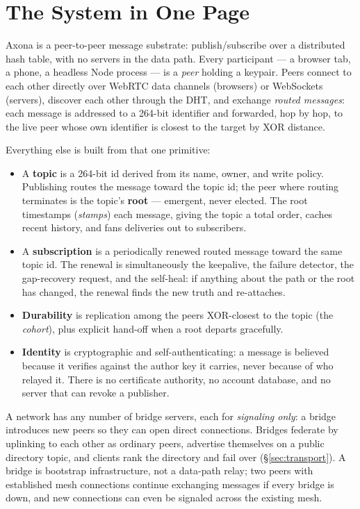 \documentclass[nobib]{tufte-handout}
\begin{document}
\section{The System in One Page}

Axona is a peer-to-peer message substrate: publish/subscribe over a
distributed hash table, with no servers in the data path. Every
participant --- a browser tab, a phone, a headless Node process --- is a
\emph{peer} holding a keypair. Peers connect to each other directly over
WebRTC data channels (browsers) or WebSockets (servers), discover each
other through the DHT, and exchange \emph{routed messages}: each message
is addressed to a 264-bit identifier and forwarded, hop by hop, to the
live peer whose own identifier is closest to the target by XOR distance.

Everything else is built from that one primitive:

\begin{itemize}
\item A \textbf{topic} is a 264-bit id derived from its name, owner, and
  write policy. Publishing routes the message toward the topic id; the
  peer where routing terminates is the topic's \textbf{root} --- emergent,
  never elected. The root timestamps (\emph{stamps}) each message, giving
  the topic a total order, caches recent history, and fans deliveries out
  to subscribers.
\item A \textbf{subscription} is a periodically renewed routed message
  toward the same topic id. The renewal is simultaneously the keepalive,
  the failure detector, the gap-recovery request, and the self-heal: if
  anything about the path or the root has changed, the renewal finds the
  new truth and re-attaches.
\item \textbf{Durability} is replication among the peers XOR-closest to
  the topic (the \emph{cohort}), plus explicit hand-off when a root
  departs gracefully.
\item \textbf{Identity} is cryptographic and self-authenticating: a
  message is believed because it verifies against the author key it
  carries, never because of who relayed it. There is no certificate
  authority, no account database, and no server that can revoke a
  publisher.
\end{itemize}

A network has any number of bridge servers, each for \emph{signaling
only}: a bridge introduces new peers so they can open direct
connections. Bridges federate by
uplinking to each other as ordinary peers, advertise themselves on a
public directory topic, and clients rank the directory and fail over
(\S\ref{sec:transport}). A bridge is bootstrap infrastructure, not a
data-path relay; two peers with established mesh connections continue
exchanging messages if every bridge is down, and new connections can even be signaled across the
existing mesh.
\end{document}

